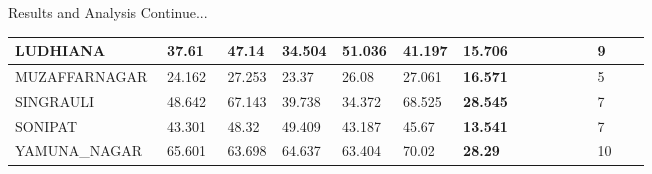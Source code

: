 \documentclass[12pt, aspectratio=169]{beamer}
\begin{document}
\begin{frame}{Results and Analysis  \tiny{Continue...}}
\begin{table}
\begin{tabular}[c]{|p{0.165\linewidth}|p{0.096\linewidth}|p{0.044\linewidth}|p{0.044\linewidth}|p{0.06\linewidth}|p{0.044\linewidth}|p{0.206\linewidth}|p{0.08\linewidth}|}
		LUDHIANA       & 37.61        & 47.14     & 34.504    & 51.036     & 41.197    & \textbf{15.706} & 9      \\ \hline
		MUZAFFARNAGAR  & 24.162       & 27.253    & 23.37     & 26.08      & 27.061    & \textbf{16.571} & 5      \\ \hline
		SINGRAULI      & 48.642       & 67.143    & 39.738    & 34.372     & 68.525    & \textbf{28.545} & 7      \\ \hline
		SONIPAT        & 43.301       & 48.32     & 49.409    & 43.187     & 45.67     & \textbf{13.541} & 7      \\ \hline
		YAMUNA\_NAGAR  & 65.601       & 63.698    & 64.637    & 63.404     & 70.02     & \textbf{28.29}  & 10    \\ \hline
		\end{tabular}
	\end{table}
\end{frame}
\end{document}
